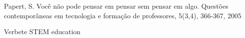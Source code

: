 \documentclass[
12pt,		%
openright,	%
twoside,  %
a4paper,			%
chapter=TITLE,		%
english,			%
french,				%
spanish,			%
brazil				%
]{USPSC-classe/USPSC}
\begin{document}
\begin{flushleft}
\begin{flushleft}
\begin{flushleft}
\begin{flushleft}
\begin{flushleft}
\begin{flushleft}
\begin{flushleft}
\begin{flushleft}
[PAPERT, 2005a] Papert, S. Voc\^e n\~ao pode pensar em pensar sem pensar em algo. Quest\~oes contempor\^aneas em tecnologia e forma\c{c}\~ao de professores, 5(3,4), 366-367, 2005
\end{flushleft}


\end{flushleft}


\end{flushleft}


\end{flushleft}


\end{flushleft}


\end{flushleft}


\end{flushleft}


\end{flushleft}


\begin{flushleft}
\begin{flushleft}
\begin{flushleft}
\begin{flushleft}
\begin{flushleft}
\begin{flushleft}
\begin{flushleft}
\begin{flushleft}
[BRITANNICA, 2022a] Verbete STEM education
\end{flushleft}


\end{flushleft}


\end{flushleft}


\end{flushleft}


\end{flushleft}


\end{flushleft}


\end{flushleft}


\end{flushleft}
\end{document}
